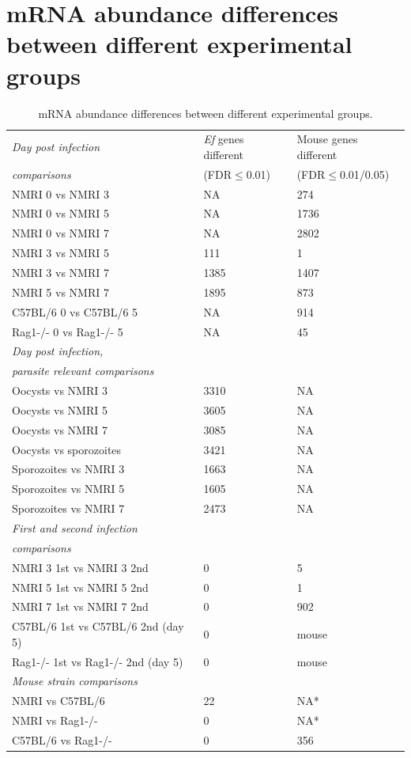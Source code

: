\documentclass{bmcart}
\begin{document}
\section{mRNA abundance differences between different experimental groups}
\setlength{\tabcolsep}{8pt}
\begin{table}[H]
\small
\begin{center}
\caption{mRNA abundance differences between different experimental groups.}
\begin{tabular}{*3l}    \toprule
\textit{Day post infection} & \textit{Ef} genes different & Mouse genes different \\ 
	\textit{comparisons} 	    & (FDR$\leq$0.01) &  (FDR$\leq$0.01/0.05) \\ \midrule
	NMRI 0 vs NMRI 3		& NA   & 274 \\
	NMRI 0 vs NMRI 5		& NA   & 1736 \\
	NMRI 0 vs NMRI 7		& NA   & 2802 \\
	NMRI 3 vs NMRI 5     		& 111  & 1 \\
	NMRI 3 vs NMRI 7  		& 1385 & 1407 \\ 
	NMRI 5 vs NMRI 7  		& 1895 & 873 \\ 
	C57BL/6 0 vs C57BL/6 5		& NA	& 914 \\
	Rag1-/- 0 vs Rag1-/- 5		& NA	& 45 \\ \midrule
\textit{Day post infection,} & 		 & 		 \\ 
\textit{parasite relevant comparisons} 	    & 		&  \\ \midrule
	Oocysts vs NMRI 3  	& 3310 & NA \\  
	Oocysts vs NMRI 5	& 3605 & NA \\ 
	Oocysts vs NMRI 7	& 3085 & NA \\ 
	Oocysts vs sporozoites  & 3421 & NA \\
	Sporozoites vs NMRI 3 	& 1663 & NA \\
	Sporozoites vs NMRI 5 	& 1605 & NA \\
	Sporozoites vs NMRI 7 	& 2473 & NA \\ \midrule
\textit{First and second infection} & 		 & 	 \\ 
\textit{comparisons} 	    & 		& 	\\ \midrule
	NMRI 3 1st vs NMRI 3 2nd  	& 0  & 5 \\
	NMRI 5 1st vs NMRI 5 2nd  	& 0  & 1 \\
	NMRI 7 1st vs NMRI 7 2nd  	& 0  & 902 \\
	C57BL/6 1st vs C57BL/6 2nd (day 5) & 0 &  mouse \\
	Rag1-/- 1st vs Rag1-/- 2nd (day 5) & 0 & mouse  \\ \midrule
\textit{Mouse strain comparisons} & 		 & 	 \\ \midrule
	NMRI vs C57BL/6 		& 22 	& NA* \\		
	NMRI vs Rag1-/-     		& 0 & NA* 	\\
	C57BL/6 vs Rag1-/-  		& 0   & 356 	\\ \midrule
\bottomrule
	\hline
\end{tabular}
\end{center}
\end{table}
\end{document}
